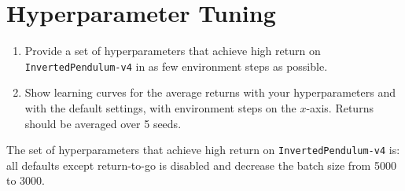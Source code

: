 \documentclass{article}
\begin{document}
\newpage\section{Hyperparameter Tuning}
\begin{enumerate}
    \item Provide a set of hyperparameters that achieve high return on \verb|InvertedPendulum-v4| in as few environment steps as possible.
    \item Show learning curves for the average returns with your hyperparameters and with the default settings, with environment steps on the $x$-axis. Returns should be averaged over 5 seeds.
\end{enumerate}

\begin{sol}
    The set of hyperparameters that achieve high return on \texttt{InvertedPendulum-v4} is: all defaults except return-to-go is disabled and decrease the batch size from 5000 to 3000. 


\end{sol}
\end{document}
